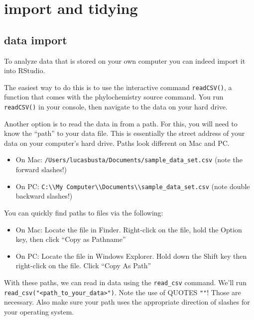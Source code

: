 \documentclass[
]{krantz}
\providecommand{\tightlist}{%
  \setlength{\itemsep}{0pt}\setlength{\parskip}{0pt}}
\begin{document}
\hypertarget{import-and-tidying}{%
\section*{import and tidying}\label{import-and-tidying}}

\hypertarget{data-import}{%
\subsection{data import}\label{data-import}}

To analyze data that is stored on your own computer you can indeed import it into RStudio.

The easiest way to do this is to use the interactive command \texttt{readCSV()}, a function that comes with the phylochemistry source command. You run \texttt{readCSV()} in your console, then navigate to the data on your hard drive.

Another option is to read the data in from a path. For this, you will need to know the ``path'' to your data file. This is essentially the street address of your data on your computer's hard drive. Paths look different on Mac and PC.

\begin{itemize}
\tightlist
\item
  On Mac: \texttt{/Users/lucasbusta/Documents/sample\_data\_set.csv} (note the forward slashes!)
\item
  On PC: \texttt{C:\textbackslash{}\textbackslash{}My\ Computer\textbackslash{}\textbackslash{}Documents\textbackslash{}\textbackslash{}sample\_data\_set.csv} (note double backward slashes!)
\end{itemize}

You can quickly find paths to files via the following:

\begin{itemize}
\tightlist
\item
  On Mac: Locate the file in Finder. Right-click on the file, hold the Option key, then click ``Copy as Pathname''
\item
  On PC: Locate the file in Windows Explorer. Hold down the Shift key then right-click on the file. Click ``Copy As Path''
\end{itemize}

With these paths, we can read in data using the \texttt{read\_csv} command. We'll run \texttt{read\_csv("\textless{}path\_to\_your\_data\textgreater{}")}. Note the use of QUOTES \texttt{""}! Those are necessary. Also make sure your path uses the appropriate direction of slashes for your operating system.
\end{document}
